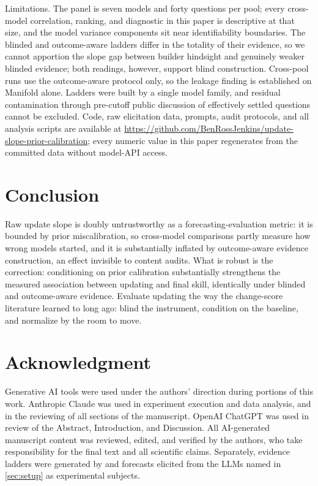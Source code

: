 \documentclass[conference]{IEEEtran}
\theoremstyle{plain}
\theoremstyle{remark}
\begin{document}
Limitations. The panel is seven models and forty questions per pool; every cross-model correlation, ranking, and diagnostic in this paper is descriptive at that size, and the model variance components sit near identifiability boundaries. The blinded and outcome-aware ladders differ in the totality of their evidence, so we cannot apportion the slope gap between builder hindsight and genuinely weaker blinded evidence; both readings, however, support blind construction. Cross-pool runs use the outcome-aware protocol only, so the leakage finding is established on Manifold alone. Ladders were built by a single model family, and residual contamination through pre-cutoff public discussion of effectively settled questions cannot be excluded. Code, raw elicitation data, prompts, audit protocols, and all analysis scripts are available at \url{https://github.com/BenRossJenkins/update-slope-prior-calibration}; every numeric value in this paper regenerates from the committed data without model-API access.

\section{Conclusion}

Raw update slope is doubly untrustworthy as a forecasting-evaluation metric: it is bounded by prior miscalibration, so cross-model comparisons partly measure how wrong models started, and it is substantially inflated by outcome-aware evidence construction, an effect invisible to content audits. What is robust is the correction: conditioning on prior calibration substantially strengthens the measured association between updating and final skill, identically under blinded and outcome-aware evidence. Evaluate updating the way the change-score literature learned to long ago: blind the instrument, condition on the baseline, and normalize by the room to move.

\section*{Acknowledgment}
Generative AI tools were used under the authors' direction during portions of this work. Anthropic Claude was used in experiment execution and data analysis, and in the reviewing of all sections of the manuscript. OpenAI ChatGPT was used in review of the Abstract, Introduction, and Discussion. All AI-generated manuscript content was reviewed, edited, and verified by the authors, who take responsibility for the final text and all scientific claims. Separately, evidence ladders were generated by and forecasts elicited from the LLMs named in \cref{sec:setup} as experimental subjects.



\end{document}
